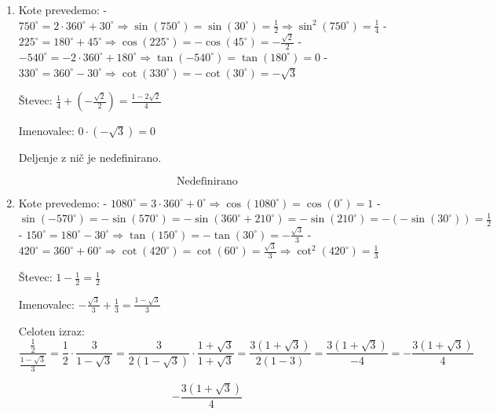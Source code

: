 \documentclass[a4paper,12pt]{letter}
\begin{document}
\begin{enumerate}
Števec: \(\frac{1}{2} \cdot \frac{\sqrt{3}}{2} = \frac{\sqrt{3}}{4}\)

Imenovalec: \(\sqrt{3} - (-1) = \sqrt{3} + 1\)

Celoten izraz:
\[
\frac{\frac{\sqrt{3}}{4}}{\sqrt{3} + 1} = \frac{\sqrt{3}}{4(\sqrt{3} + 1)} \cdot \frac{\sqrt{3} - 1}{\sqrt{3} - 1} = \frac{3 - \sqrt{3}}{4(3 - 1)} = \frac{3 - \sqrt{3}}{8}
\]

\[
\boxed{\frac{3 - \sqrt{3}}{8}}
\]

\item

Kote prevedemo:
- \(750^\circ = 2 \cdot 360^\circ + 30^\circ \Rightarrow \sin(750^\circ) = \sin(30^\circ) = \frac{1}{2} \Rightarrow \sin^2(750^\circ) = \frac{1}{4}\)
- \(225^\circ = 180^\circ + 45^\circ \Rightarrow \cos(225^\circ) = -\cos(45^\circ) = -\frac{\sqrt{2}}{2}\)
- \(-540^\circ = -2 \cdot 360^\circ + 180^\circ \Rightarrow \tan(-540^\circ) = \tan(180^\circ) = 0\)
- \(330^\circ = 360^\circ - 30^\circ \Rightarrow \cot(330^\circ) = -\cot(30^\circ) = -\sqrt{3}\)

Števec: \(\frac{1}{4} + \left(-\frac{\sqrt{2}}{2}\right) = \frac{1 - 2\sqrt{2}}{4}\)

Imenovalec: \(0 \cdot (-\sqrt{3}) = 0\)

Deljenje z nič je nedefinirano.

\[
\boxed{\text{Nedefinirano}}
\]

\item 

Kote prevedemo:
- \(1080^\circ = 3 \cdot 360^\circ + 0^\circ \Rightarrow \cos(1080^\circ) = \cos(0^\circ) = 1\)
- \(\sin(-570^\circ) = -\sin(570^\circ) = -\sin(360^\circ + 210^\circ) = -\sin(210^\circ) = -(-\sin(30^\circ)) = \frac{1}{2}\)
- \(150^\circ = 180^\circ - 30^\circ \Rightarrow \tan(150^\circ) = -\tan(30^\circ) = -\frac{\sqrt{3}}{3}\)
- \(420^\circ = 360^\circ + 60^\circ \Rightarrow \cot(420^\circ) = \cot(60^\circ) = \frac{\sqrt{3}}{3} \Rightarrow \cot^2(420^\circ) = \frac{1}{3}\)

Števec: \(1 - \frac{1}{2} = \frac{1}{2}\)

Imenovalec: \(-\frac{\sqrt{3}}{3} + \frac{1}{3} = \frac{1 - \sqrt{3}}{3}\)

Celoten izraz:
\[
\frac{\frac{1}{2}}{\frac{1 - \sqrt{3}}{3}} = \frac{1}{2} \cdot \frac{3}{1 - \sqrt{3}} = \frac{3}{2(1 - \sqrt{3})} \cdot \frac{1 + \sqrt{3}}{1 + \sqrt{3}} = \frac{3(1 + \sqrt{3})}{2(1 - 3)} = \frac{3(1 + \sqrt{3})}{-4} = -\frac{3(1 + \sqrt{3})}{4}
\]

\[
\boxed{-\frac{3(1 + \sqrt{3})}{4}}
\]

\end{enumerate}
\end{document}
